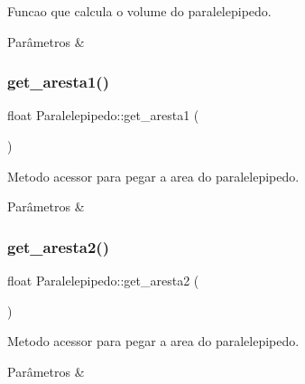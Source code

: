 Funcao que calcula o volume do paralelepipedo. 


\begin{DoxyParams}{Parâmetros}
{\em } & \\
\hline
\end{DoxyParams}
\mbox{\label{classParalelepipedo_a0a358a9909745342df7520db96a7f88e}} 
\subsubsection{\texorpdfstring{get\+\_\+aresta1()}{get\_aresta1()}}
{\footnotesize\ttfamily float Paralelepipedo\+::get\+\_\+aresta1 (\begin{DoxyParamCaption}{ }\end{DoxyParamCaption})}



Metodo acessor para pegar a area do paralelepipedo. 


\begin{DoxyParams}{Parâmetros}
{\em } & \\
\hline
\end{DoxyParams}
\mbox{\label{classParalelepipedo_a9505c63ed99ef3d6e4d489d03c08526b}} 
\subsubsection{\texorpdfstring{get\+\_\+aresta2()}{get\_aresta2()}}
{\footnotesize\ttfamily float Paralelepipedo\+::get\+\_\+aresta2 (\begin{DoxyParamCaption}{ }\end{DoxyParamCaption})}



Metodo acessor para pegar a area do paralelepipedo. 


\begin{DoxyParams}{Parâmetros}
{\em } & \\
\hline
\end{DoxyParams}
\mbox{\label{classParalelepipedo_af47229ad9870c09804c0e0f958ccf6be}} 
